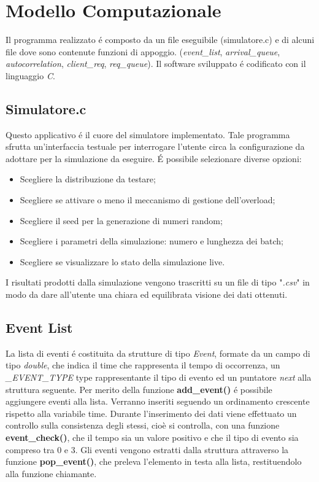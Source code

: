 \chapter{Modello Computazionale}
Il programma realizzato \'e composto da un file eseguibile (simulatore.c) e di 
alcuni file dove sono contenute funzioni di appoggio. (\textit{event\_list}, 
\textit{arrival\_queue}, \textit{autocorrelation}, \textit{client\_req}, 
\textit{req\_queue}).
Il software sviluppato \'e codificato con il linguaggio \textit{C}.

\section{Simulatore.c}

Questo applicativo \'e il cuore del simulatore implementato. Tale programma 
sfrutta un'interfaccia testuale per interrogare l'utente circa la configurazione 
da adottare per la simulazione da eseguire. 
\'E possibile selezionare diverse opzioni:
\begin{itemize}
\item Scegliere la distribuzione da testare;
\item Scegliere se attivare o meno il meccanismo di gestione dell'overload;
\item Scegliere il seed per la generazione di numeri random;
\item Scegliere i parametri della simulazione: numero e lunghezza dei batch;
\item Scegliere se visualizzare lo stato della simulazione live.
\end{itemize}

I risultati prodotti dalla simulazione vengono trascritti su un file di tipo 
"\textit{.csv}"  in modo da dare all'utente una chiara ed equilibrata visione 
dei dati ottenuti.

\section{Event List}
La lista di eventi \'e costituita da strutture di tipo \textit{Event}, formate 
da un campo di tipo \textit{double}, che indica il time che rappresenta il tempo 
di occorrenza, un \textit{\_EVENT\_TYPE} type rappresentante il tipo di evento 
ed un puntatore \textit{next} alla struttura seguente.
Per merito della funzione \textbf{add\_event()} \'e possibile aggiungere eventi 
alla lista. Verranno inseriti seguendo un ordinamento crescente rispetto alla 
variabile time. Durante l'inserimento dei dati viene effettuato un controllo 
sulla consistenza degli stessi, cioè si controlla, con una funzione 
\textbf{event\_check()}, che il tempo sia un valore positivo e che il tipo di 
evento sia compreso tra 0 e 3.
Gli eventi vengono estratti dalla struttura attraverso la funzione 
\textbf{pop\_event()}, che preleva l'elemento in testa alla lista, restituendolo 
alla funzione chiamante.

